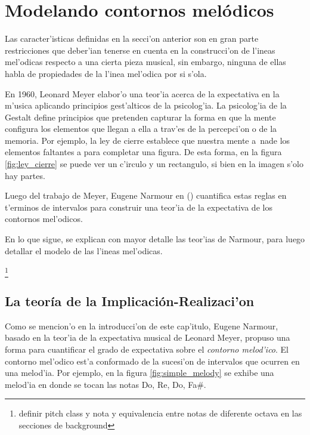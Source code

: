 \section{Modelando contornos mel\'odicos}
\label{sec:melodic_contour}
Las caracter'isticas definidas en la secci'on anterior son en gran parte restricciones que deber'ian tenerse en cuenta en la construcci'on 
de l'ineas mel'odicas respecto a una cierta pieza musical, sin embargo, ninguna de ellas habla de propiedades de la l'inea mel'odica 
por si s'ola.

En 1960, Leonard Meyer elabor'o una teor'ia acerca de la expectativa en la m'usica aplicando principios gest'alticos de la psicolog'ia. La 
psicolog'ia de la Gestalt define principios que pretenden capturar la forma en que la mente configura los elementos que llegan a ella a trav'es 
de la percepci'on o de la memoria. Por ejemplo, la ley de cierre establece que nuestra mente a~nade los elementos faltantes a para completar una 
figura. De esta forma, en la figura \ref{fig:ley_cierre} se puede ver un c'irculo y un rectangulo, si bien en la imagen s'olo hay partes.

\begin{imagen}
    \width{6cm}
\end{imagen}

Luego del trabajo de Meyer, Eugene Narmour en (\cita) cuantifica estas reglas en t'erminos de intervalos para construir una teor'ia de 
la expectativa de los contornos mel'odicos. 

En lo que sigue, se explican con mayor detalle las teor'ias de Narmour, para luego detallar el modelo de las l'ineas mel'odicas.

\footnote{definir pitch class y nota y equivalencia entre notas de diferente octava en las secciones de background} 

\subsection{La teor\'ia de la Implicaci\'on-Realizaci'on}
Como se mencion'o en la introducci'on de este cap'itulo, Eugene Narmour, basado en la teor'ia de la expectativa musical de Leonard Meyer, propuso una forma para cuantificar
el grado de expectativa sobre el \emph{contorno melod'ico}. El contorno mel'odico est'a conformado de la sucesi'on de intervalos que ocurren en una melod'ia. Por ejemplo, 
en la figura \ref{fig:simple_melody} se exhibe una melod'ia en donde se tocan las notas Do, Re, Do, Fa\#. 


